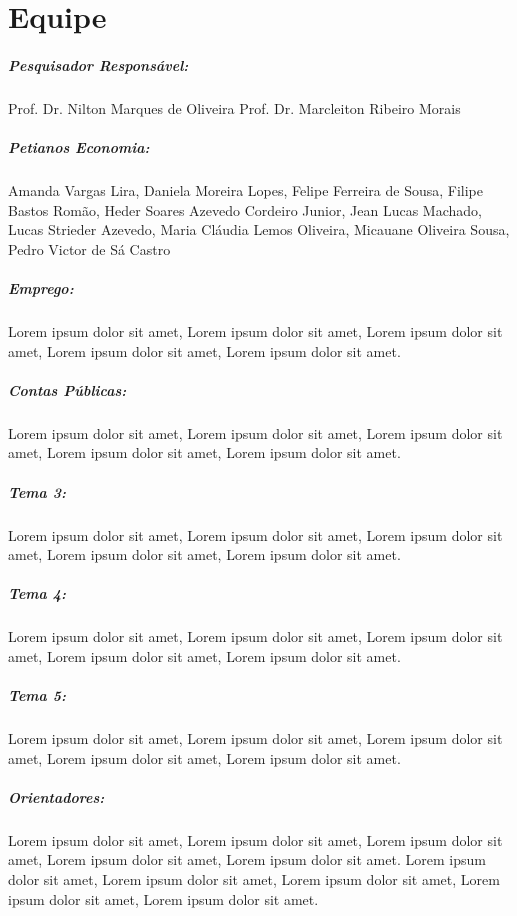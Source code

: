 \chapter*{Equipe}
  \begin{center}
    \parbox{0.7\linewidth}{
      \paragraph{Pesquisador Responsável:}
        Prof. Dr. Nilton Marques de Oliveira
        Prof. Dr. Marcleiton Ribeiro Morais
      \paragraph{Petianos Economia:}
        Amanda Vargas Lira, Daniela Moreira Lopes, Felipe Ferreira de Sousa, Filipe Bastos Romão, Heder Soares Azevedo Cordeiro Junior, Jean Lucas Machado, Lucas Strieder Azevedo, Maria Cláudia Lemos Oliveira, Micauane Oliveira Sousa, Pedro Victor de Sá Castro
      \paragraph{Emprego:}
        Lorem ipsum dolor sit amet, Lorem ipsum dolor sit amet, Lorem ipsum dolor sit amet, Lorem ipsum dolor sit amet, Lorem ipsum dolor sit amet.
      \paragraph{Contas Públicas:}
        Lorem ipsum dolor sit amet, Lorem ipsum dolor sit amet, Lorem ipsum dolor sit amet, Lorem ipsum dolor sit amet, Lorem ipsum dolor sit amet.
      \paragraph{Tema 3:}
        Lorem ipsum dolor sit amet, Lorem ipsum dolor sit amet, Lorem ipsum dolor sit amet, Lorem ipsum dolor sit amet, Lorem ipsum dolor sit amet.
      \paragraph{Tema 4:}
        Lorem ipsum dolor sit amet, Lorem ipsum dolor sit amet, Lorem ipsum dolor sit amet, Lorem ipsum dolor sit amet, Lorem ipsum dolor sit amet.
      \paragraph{Tema 5:}
        Lorem ipsum dolor sit amet, Lorem ipsum dolor sit amet, Lorem ipsum dolor sit amet, Lorem ipsum dolor sit amet, Lorem ipsum dolor sit amet.
      \paragraph{Orientadores:}
        Lorem ipsum dolor sit amet, Lorem ipsum dolor sit amet, Lorem ipsum dolor sit amet, Lorem ipsum dolor sit amet, Lorem ipsum dolor sit amet. Lorem ipsum dolor sit amet, Lorem ipsum dolor sit amet, Lorem ipsum dolor sit amet, Lorem ipsum dolor sit amet, Lorem ipsum dolor sit amet.
    }
  \end{center}
